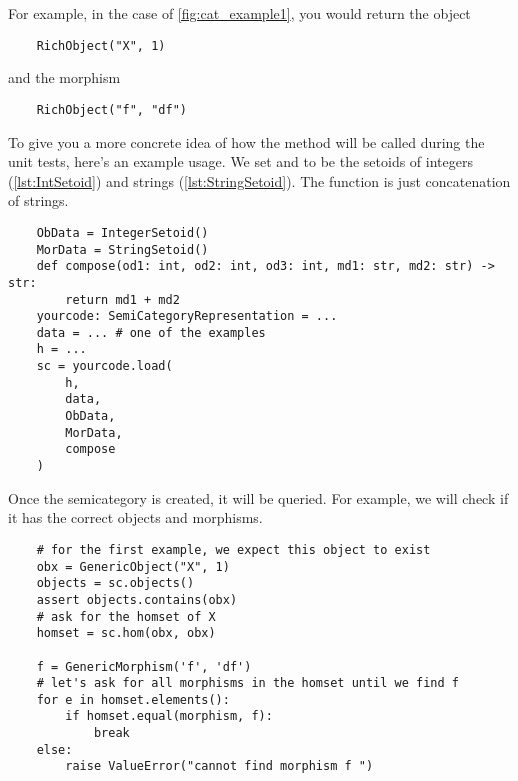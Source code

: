 

For example, in the case of \cref{fig:cat_example1}, you would return the object
\begin{verbatim}
    RichObject("X", 1)
\end{verbatim}
and the morphism
\begin{verbatim}
    RichObject("f", "df")
\end{verbatim}

To give you a more concrete idea of how the method will be called during the unit tests, here's an example usage.
We set   and  to be the setoids of integers (\cref{lst:IntSetoid}) and strings (\cref{lst:StringSetoid}).
The  function is just concatenation of strings.

\begin{verbatim}
    ObData = IntegerSetoid()
    MorData = StringSetoid()
    def compose(od1: int, od2: int, od3: int, md1: str, md2: str) -> str:
        return md1 + md2
    yourcode: SemiCategoryRepresentation = ...
    data = ... # one of the examples 
    h = ...
    sc = yourcode.load(
        h,
        data,
        ObData,
        MorData,
        compose
    )
\end{verbatim}

Once the semicategory is created, it will be queried. For example, we will check if it has the correct objects and morphisms.

\begin{verbatim}
    # for the first example, we expect this object to exist
    obx = GenericObject("X", 1)
    objects = sc.objects()
    assert objects.contains(obx)
    # ask for the homset of X
    homset = sc.hom(obx, obx)

    f = GenericMorphism('f', 'df')
    # let's ask for all morphisms in the homset until we find f
    for e in homset.elements():
        if homset.equal(morphism, f):
            break
    else:
        raise ValueError("cannot find morphism f ")
\end{verbatim}




